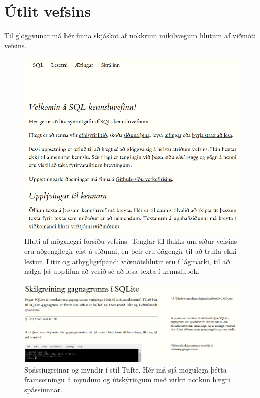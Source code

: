 \documentclass[a4paper,12pt,twoside,BCOR=10mm]{scrbook}
\begin{document}
\section{Útlit vefsins}

Til glöggvunar má hér finna skjáskot af nokkrum mikilvægum hlutum af viðmóti vefsins. 

\begin{figure}[h]
\caption[Forsíða vefsins]{Hluti af mögulegri forsíðu vefsins. Tenglar til flakks um síður vefsins eru aðgengilegir efst á síðunni, en þeir eru óágengir til að trufla ekki lestur. Litir og athygligrípandi viðmótshlutir eru í lágmarki, til að nálga þá upplifun að verið sé að lesa texta í kennslubók.}
\label{fig:index-page}
\begin{center}
\includegraphics[width=\textwidth]{mv-adal}
\end{center}
\end{figure}

\begin{figure}
\caption[Spássíugreinar og myndir í stíl Tufte]{Spássíugreinar og myndir í stíl Tufte. Hér má sjá mögulega þétta framsetningu á myndum og útskýringum með virkri notkun hægri spássíunnar.}
\label{fig:tufte-example}
\includegraphics[width=\textwidth]{mv-tufte-example}
\end{figure}
\end{document}
